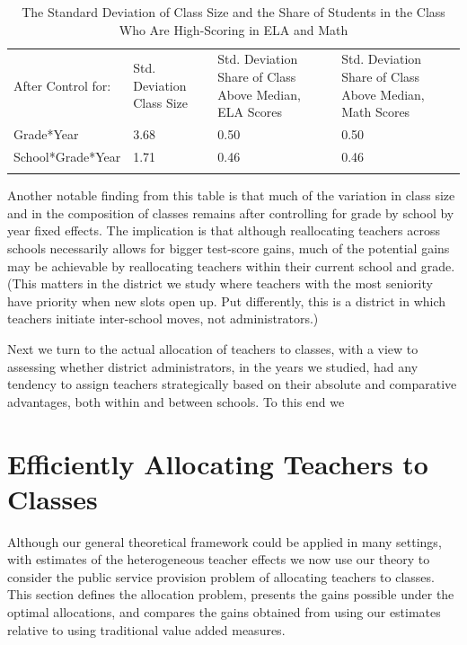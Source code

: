 \documentclass[12pt]{article}
\theoremstyle{definition}
\theoremstyle{definition}
\theoremstyle{definition}
\theoremstyle{definition}
\begin{document}
\begin{table}[]


\begin{tabular}{ m{3.5cm}  m{3.5cm} m{3.5cm} m{3.5cm} }
After Control for: & Std. Deviation Class Size & Std. Deviation Share of Class Above Median, ELA Scores & Std. Deviation Share of Class Above Median, Math Scores   \\
Grade*Year         & 3.68                      & 0.50                                                  & 0.50                                                     \\
School*Grade*Year  & 1.71                      & 0.46                                                  & 0.46                                                     \\
                   &                           &                                                        &                                                          
\end{tabular}
\label{table:stddev1}
\caption{The Standard Deviation of Class Size and the Share of Students in the Class Who Are High-Scoring in ELA and Math}
\end{table}

Another notable finding from this table is that much of the variation in class size and in the composition of classes remains after controlling for grade by school by year fixed effects. The implication is that although reallocating teachers across schools necessarily allows for bigger test-score gains, much of the potential gains may be achievable by reallocating teachers within their current school and grade. (This matters in the district we study where teachers with the most seniority have priority when new slots open up. Put differently, this is a district in which teachers initiate inter-school moves, not administrators.)

Next we turn to the actual allocation of teachers to classes, with a view to assessing whether district administrators, in the years we studied, had any tendency to assign teachers strategically based on their absolute and comparative advantages, both within and between schools. To this end we 




\section{Efficiently Allocating Teachers to Classes}
\label{efficiently_allocating}
Although our general theoretical framework could be applied in many settings, with estimates of the heterogeneous teacher effects we now use our theory to consider the public service provision problem of allocating teachers to classes. This section defines the allocation problem, presents the gains possible under the optimal allocations, and compares the gains obtained from using our estimates relative to using traditional value added measures.
\end{document}
